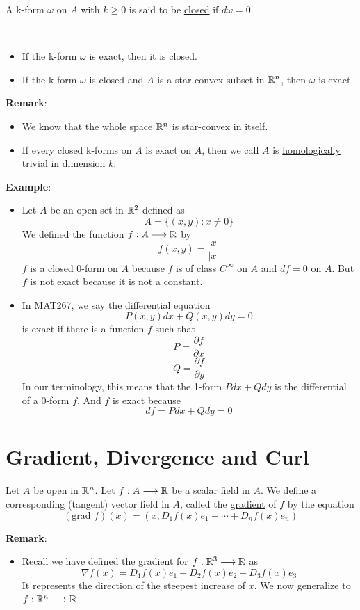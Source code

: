 \begin{definition}
    A k-form $\omega$ on $A$ with $k\geq0$ is said to be \underline{closed} if $d\omega=0$.
\end{definition}

\begin{theorem*}\
    \begin{itemize}
        \item If the k-form $\omega$ is exact, then it is closed.
        \item If the k-form $\omega$ is closed and $A$ is a star-convex subset in $\mathbb{R}^n$, then $\omega$ is exact.
    \end{itemize}
\end{theorem*}
\noindent\textbf{Remark}:
\begin{itemize}
    \item We know that the whole space $\mathbb{R}^n$ is star-convex in itself.
    \item If every closed k-forms on $A$ is exact on $A$, then we call $A$ is \underline{homologically trivial in dimension $k$}.
\end{itemize}
\noindent\textbf{Example}:
\begin{itemize}
    \item Let $A$ be an open set in $\mathbb{R}^2$ defined as $$A=\{(x,y):x\neq 0\}$$
    We defined the function $f:A\longrightarrow\mathbb{R}$ by $$f(x,y)=\frac{x}{|x|}$$
    $f$ is a closed 0-form on $A$ because $f$ is of class $C^{\infty}$ on $A$ and $df=0$ on $A$. But $f$ is not exact because it is not a constant.
    \item In MAT267, we say the differential equation $$P(x,y)dx+Q(x,y)dy=0$$
    is exact if there is a function $f$ such that $$P=\frac{\partial f}{\partial x}$$ $$Q=\frac{\partial f}{\partial y}$$
    In our terminology, this means that the 1-form $Pdx+Qdy$ is the differential of a 0-form $f$. And $f$ is exact because $$df=Pdx+Qdy=0$$
\end{itemize}

\section{Gradient, Divergence and Curl}

\begin{definition}
    Let $A$ be open in $\mathbb{R}^n$. Let $f:A\longrightarrow\mathbb{R}$ be a scalar field in $A$. 
    We define a corresponding (tangent) vector field in $A$, called the \underline{gradient} of $f$ by the equation 
    $$(\text{grad }f)(x)=(x;D_1f(x)e_1+\cdots+D_nf(x)e_n)$$
\end{definition}
\noindent\textbf{Remark}:
\begin{itemize}
    \item Recall we have defined the gradient for $f:\mathbb{R}^3\longrightarrow\mathbb{R}$ as 
    $$\nabla f(x)=D_1f(x)e_1+D_2f(x)e_2+D_3f(x)e_3$$
    It represents the direction of the steepest increase of $x$. We now generalize to $f:\mathbb{R}^n\longrightarrow\mathbb{R}$. 
\end{itemize}

